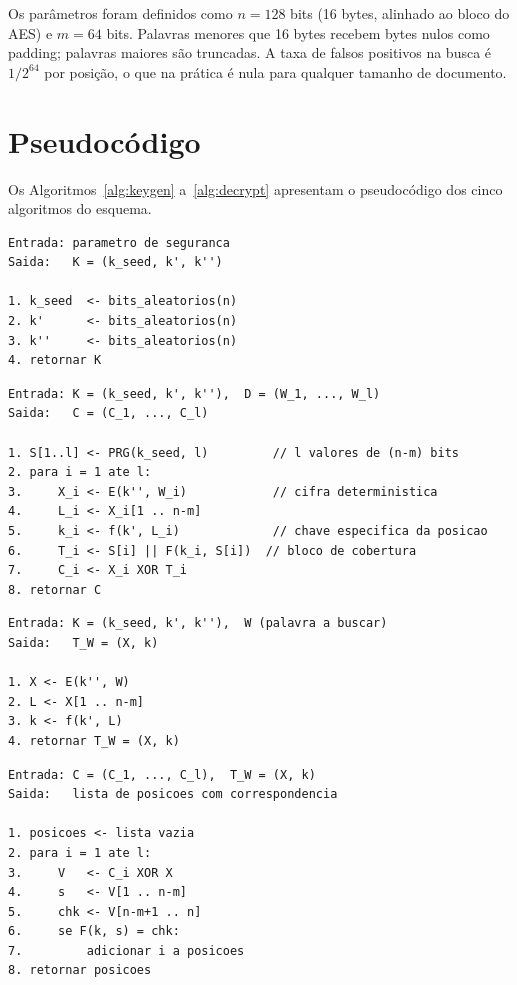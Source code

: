 \documentclass[
  12pt,
  oneside,
  a4paper,
  brazil
]{abntex2}
\begin{document}
Os parâmetros foram definidos como $n = 128$ bits (16 bytes, alinhado
ao bloco do AES) e $m = 64$ bits. Palavras menores que 16 bytes
recebem bytes nulos como padding; palavras maiores são truncadas. A
taxa de falsos positivos na busca é $1/2^{64}$ por posição, o que na
prática é nula para qualquer tamanho de documento.

\section{Pseudocódigo}

Os Algoritmos~\ref{alg:keygen} a~\ref{alg:decrypt} apresentam o
pseudocódigo dos cinco algoritmos do esquema.

\begin{lstlisting}[caption={KeyGen},label=alg:keygen]
Entrada: parametro de seguranca
Saida:   K = (k_seed, k', k'')

1. k_seed  <- bits_aleatorios(n)
2. k'      <- bits_aleatorios(n)
3. k''     <- bits_aleatorios(n)
4. retornar K
\end{lstlisting}

\begin{lstlisting}[caption={Encrypt},label=alg:encrypt]
Entrada: K = (k_seed, k', k''),  D = (W_1, ..., W_l)
Saida:   C = (C_1, ..., C_l)

1. S[1..l] <- PRG(k_seed, l)         // l valores de (n-m) bits
2. para i = 1 ate l:
3.     X_i <- E(k'', W_i)            // cifra deterministica
4.     L_i <- X_i[1 .. n-m]
5.     k_i <- f(k', L_i)             // chave especifica da posicao
6.     T_i <- S[i] || F(k_i, S[i])  // bloco de cobertura
7.     C_i <- X_i XOR T_i
8. retornar C
\end{lstlisting}

\begin{lstlisting}[caption={Trapdoor},label=alg:trapdoor]
Entrada: K = (k_seed, k', k''),  W (palavra a buscar)
Saida:   T_W = (X, k)

1. X <- E(k'', W)
2. L <- X[1 .. n-m]
3. k <- f(k', L)
4. retornar T_W = (X, k)
\end{lstlisting}

\begin{lstlisting}[caption={Search (executado pelo servidor)},label=alg:search]
Entrada: C = (C_1, ..., C_l),  T_W = (X, k)
Saida:   lista de posicoes com correspondencia

1. posicoes <- lista vazia
2. para i = 1 ate l:
3.     V   <- C_i XOR X
4.     s   <- V[1 .. n-m]
5.     chk <- V[n-m+1 .. n]
6.     se F(k, s) = chk:
7.         adicionar i a posicoes
8. retornar posicoes
\end{lstlisting}
\end{document}
